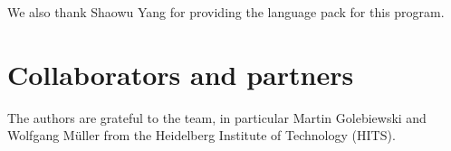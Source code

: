 We also thank Shaowu Yang for providing the \Chinese language pack for this program.


\section{Collaborators and partners}

The authors are grateful to the \SABIO team, in particular Martin Golebiewski and Wolfgang M\"uller from the Heidelberg Institute of Technology (HITS).

%
